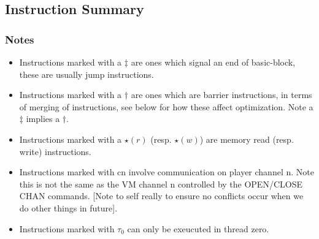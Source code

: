 \subsection{Instruction Summary}
\label{subsec:instructions}



\subsubsection{Notes}

\begin{itemize}
\item Instructions marked with a $\ddagger$ are ones which signal an end of basic-block,
these are usually jump instructions.
\item Instructions marked with a $\dagger$ are ones which are barrier instructions, in
terms of merging of instructions, see below for how these affect optimization.
Note a $\ddagger$ implies a $\dagger$.
\item Instructions marked with a $\star(r)$ (resp. $\star(w)$) are memory read (resp. write) instructions.
\item Instructions marked with cn involve communication on player channel n. Note this is not the same
	as the VM channel n controlled by the OPEN/CLOSE CHAN commands. [Note to self really to ensure
	no conflicts occur when we do other things in future].
\item Instructions marked with $\tau_0$ can only be exeucuted in thread zero.
\end{itemize}
